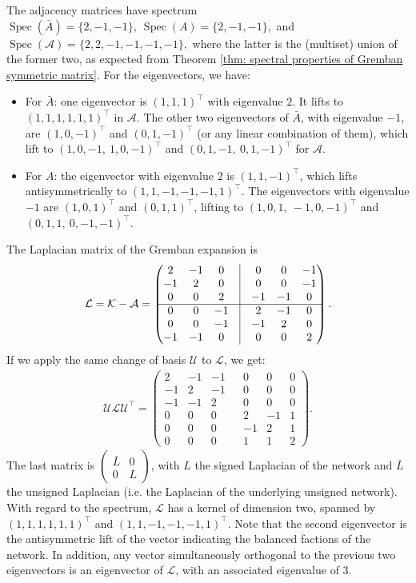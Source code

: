 \documentclass[reprint,onecolumn]{article}
\newcommand{\mc}[1]{\mathcal{#1}}
\newcommand{\1}{\mathbb{1}}
\newcommand{\0}{\mathbf{0}}
\DeclareMathOperator\spec{Spec}
\begin{document}
The adjacency matrices have spectrum
\(
\spec(\bar A)=\{2,-1,-1\},
\
\spec(A)=\{2,-1,-1\},
\)
and
\(
\spec(\mc A)
=\{2,2,-1,-1,-1,-1\},
\)
where the latter is the (multiset) union of the former two, as expected from Theorem \ref{thm: spectral properties of Gremban symmetric matrix}. For the eigenvectors, we have:
\begin{itemize}
  \item For \(\bar A\): one eigenvector is \((1,1,1)^\top\) with eigenvalue \(2\).  It lifts to
  \(
    (1,1,1, 1,1,1)^\top\) in \(\mc A. \)
  The other two eigenvectors of \(\bar A\), with eigenvalue $-1$, are \((1,0,-1)^\top\) and \((0,1,-1)^\top\) (or any linear combination of them), which lift to
  \(
    (1,0,-1,\ 1,0,-1)^\top \) and \(
    (0,1,-1,\ 0,1,-1)^\top\) for $\mc A$.
  \item For \(A\): the eigenvector with eigenvalue \(2\) is \((1,1,-1)^\top\), which lifts antisymmetrically to
  \(
    (1,1,-1, -1, -1,\allowbreak 1)^\top.
  \)
  The eigenvectors with eigenvalue \(-1\) are \((1,0,1)^\top\) and \((0,1,1)^\top\), lifting to
  \(
    (1,0,1,\ -1,0,-1)^\top\) and \((0,1,1,\ 0,-1,-1)^\top.
  \) 
\end{itemize}
The Laplacian matrix of the Gremban expansion is
\[
\mc L = \mc K - \mc A =
\begin{pmatrix}
2 & -1 & 0 & \vrule & 0 & 0 & -1 \\
-1 & 2 & 0 & \vrule & 0 & 0 & -1 \\
0 & 0 & 2 & \vrule & -1 & -1 & 0 \\
\hline
0 & 0 & -1 & \vrule & 2 & -1 & 0 \\
0 & 0 & -1 & \vrule & -1 & 2 & 0 \\
-1 & -1 & 0 & \vrule & 0 & 0 & 2
\end{pmatrix}.
\]
If we apply the same change of basis $\mc U$ to $\mc L$, we get:
\begin{align}
\mc U \mc L \mc U^\top = 
\begin{pmatrix}
2 & -1 & -1 &  & 0 & 0 & 0 \\
-1 & 2 & -1 &  & 0 & 0 & 0 \\
-1 & -1 & 2 &  & 0 & 0 & 0 \\
0 & 0 & 0 &  & 2 & -1 & 1 \\
0 & 0 & 0 &  & -1 & 2 & 1 \\
0 & 0 & 0 &  & 1 & 1 & 2
\end{pmatrix}.
\end{align}
The last matrix is \( \left(\begin{smallmatrix} \bar L & 0\\
0      & L
\end{smallmatrix}\right)\), with $L$ the signed Laplacian of the network and $\bar L$ the unsigned Laplacian (i.e. the Laplacian of the underlying unsigned network). \\
With regard to the spectrum, $\mc L$ has a kernel of dimension two, spanned by $(1,1,1,1,1,1)^\top$ and $(1,1,-1,-1, \allowbreak -1,1)^\top$. Note that the second eigenvector is the antisymmetric lift of the vector indicating the balanced factions of the network. In addition, any vector simultaneously orthogonal to the previous two eigenvectors is an eigenvector of $\mc L$, with an associated eigenvalue of 3.
%
\end{document}
